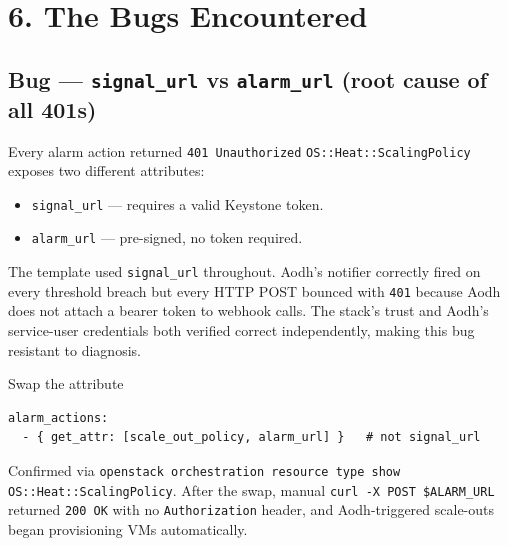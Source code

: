 \documentclass[10pt,a4paper]{article}
\begin{document}
\section*{6. The Bugs Encountered}

\subsection*{Bug --- \texttt{signal\_url} vs \texttt{alarm\_url} (root cause of all 401s)}
\begin{bugbox}{Every alarm action returned \texttt{401 Unauthorized}}
\texttt{OS::Heat::ScalingPolicy} exposes two different attributes:
\begin{itemize}
    \item \texttt{signal\_url} --- requires a valid Keystone token.
    \item \texttt{alarm\_url} --- pre-signed, no token required.
\end{itemize}
The template used \texttt{signal\_url} throughout. Aodh's notifier correctly fired on every threshold breach but every HTTP POST bounced with \texttt{401} because Aodh does not attach a bearer token to webhook calls. The stack's trust and Aodh's service-user credentials both verified correct independently, making this bug resistant to diagnosis.
\end{bugbox}
\begin{fixbox}{Swap the attribute}
\begin{lstlisting}
alarm_actions:
  - { get_attr: [scale_out_policy, alarm_url] }   # not signal_url
\end{lstlisting}
Confirmed via \texttt{openstack orchestration resource type show OS::Heat::ScalingPolicy}. After the swap, manual \texttt{curl -X POST \$ALARM\_URL} returned \texttt{200 OK} with no \texttt{Authorization} header, and Aodh-triggered scale-outs began provisioning VMs automatically.
\end{fixbox}
\newpage
\end{document}
